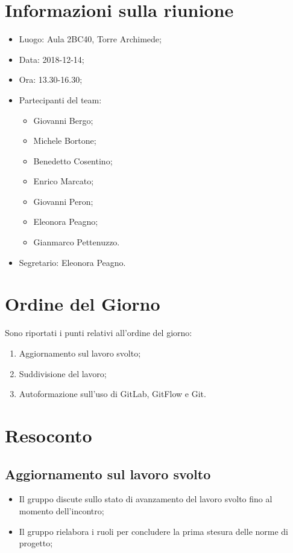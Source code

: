 \documentclass[11pt,a4paper]{article}
\begin{document}
	\section{Informazioni sulla riunione}
	\begin{itemize}
		\item Luogo: Aula 2BC40, Torre Archimede;
		\item Data: 2018-12-14;
		\item Ora: 13.30-16.30;
		\item Partecipanti del team:
			\begin{itemize}
				\item Giovanni Bergo;
				\item Michele Bortone;
				\item Benedetto Cosentino;
				\item Enrico Marcato;
				\item Giovanni Peron;
				\item Eleonora Peagno;
				\item Gianmarco Pettenuzzo.
			\end{itemize}
		\item Segretario: Eleonora Peagno.
	\end{itemize}
	
	\section{Ordine del Giorno}
	Sono riportati i punti relativi all'ordine del giorno:
	\begin{enumerate}
		\item Aggiornamento sul lavoro svolto;
		\item Suddivisione del lavoro;
		\item Autoformazione sull'uso di GitLab, GitFlow e Git.
	\end{enumerate}
	
	\section{Resoconto}
	\subsection{Aggiornamento sul lavoro svolto}
	\begin{itemize}
		\item Il gruppo discute sullo stato di avanzamento del lavoro svolto fino al momento dell'incontro;
		\item Il gruppo rielabora i ruoli per concludere la prima stesura delle norme di progetto;
		
	\end{itemize}
\end{document}
